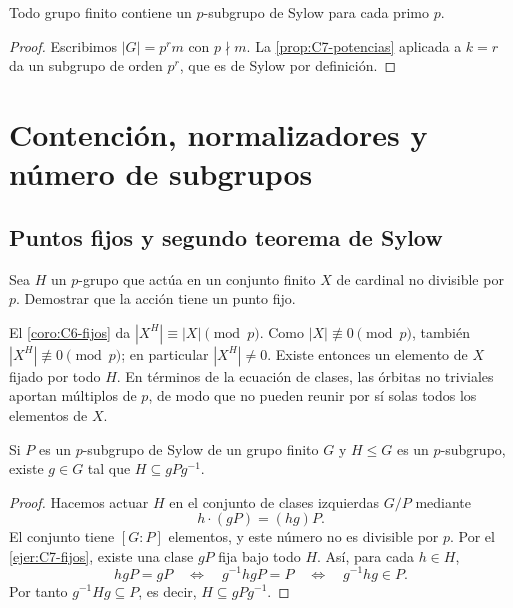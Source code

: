 \begin{teo}\label{teo:C7-sylow-I}
Todo grupo finito contiene un $p$-subgrupo de Sylow para cada primo $p$.
\end{teo}
\begin{proof}
Escribimos $|G|=p^r m$ con $p\nmid m$. La \cref{prop:C7-potencias} aplicada a $k=r$ da un subgrupo de orden $p^r$, que es de Sylow por definición.
\end{proof}

\section{Contención, normalizadores y número de subgrupos}
\subsection{Puntos fijos y segundo teorema de Sylow}
\begin{ejer}\label{ejer:C7-fijos}
Sea $H$ un $p$-grupo que actúa en un conjunto finito $X$ de cardinal no divisible por $p$. Demostrar que la acción tiene un punto fijo.
\end{ejer}
\begin{sol}
El \cref{coro:C6-fijos} da $|X^H|\equiv|X|\pmod p$. Como $|X|\not\equiv0\pmod p$, también $|X^H|\not\equiv0\pmod p$; en particular $|X^H|\ne0$. Existe entonces un elemento de $X$ fijado por todo $H$. En términos de la ecuación de clases, las órbitas no triviales aportan múltiplos de $p$, de modo que no pueden reunir por sí solas todos los elementos de $X$.
\end{sol}

\begin{teo}\label{teo:C7-sylow-II}
Si $P$ es un $p$-subgrupo de Sylow de un grupo finito $G$ y $H\le G$ es un $p$-subgrupo, existe $g\in G$ tal que $H\subseteq gPg^{-1}$.
\end{teo}
\begin{proof}
Hacemos actuar $H$ en el conjunto de clases izquierdas $G/P$ mediante
\[
h\cdot(gP)=(hg)P.
\]
El conjunto tiene $[G:P]$ elementos, y este número no es divisible por $p$. Por el \cref{ejer:C7-fijos}, existe una clase $gP$ fija bajo todo $H$. Así, para cada $h\in H$,
\[
hgP=gP\quad\Longleftrightarrow\quad
g^{-1}hgP=P\quad\Longleftrightarrow\quad g^{-1}hg\in P.
\]
Por tanto $g^{-1}Hg\subseteq P$, es decir, $H\subseteq gPg^{-1}$.
\end{proof}

